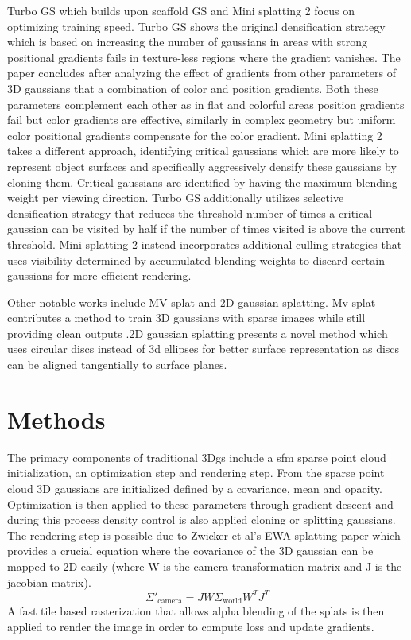 \documentclass[10pt,twocolumn]{article}
\begin{document}
Turbo GS which builds upon scaffold GS and Mini splatting 2 focus on optimizing training speed. Turbo GS shows the original densification strategy which is based on increasing the number of gaussians in areas with strong positional gradients fails in texture-less regions where the gradient vanishes. The paper concludes after analyzing the effect of gradients from other parameters of 3D gaussians
that a combination of color and position gradients. Both these parameters complement each other as in flat and colorful areas position gradients fail but color gradients are effective, similarly in complex geometry but uniform color positional gradients compensate for the color gradient\cite{lu2024turbogsaccelerating3dgaussian}. Mini splatting 2 takes a different approach, identifying critical gaussians which are more likely to represent object surfaces and specifically aggressively densify these gaussians by cloning them. Critical gaussians are identified by having the maximum blending weight per viewing direction\cite{fang2024minisplatting2building360scenes}. Turbo GS additionally utilizes selective densification strategy that reduces the threshold number of times a critical gaussian can be visited by half if the number of times visited is above the current threshold\cite{lu2024turbogsaccelerating3dgaussian}. Mini splatting 2 instead incorporates additional culling strategies that uses visibility determined by accumulated blending weights to discard certain gaussians for more efficient rendering\cite{fang2024minisplatting2building360scenes}.

Other notable works include MV splat  and 2D gaussian splatting. Mv splat contributes a method to train 3D gaussians with sparse images while still providing clean outputs \cite{Chen_2024}.2D gaussian splatting presents a novel method which uses circular discs instead of 3d ellipses for better surface representation as discs can be aligned tangentially to surface planes\cite{Huang2DGS2024}.

\section{Methods}

The primary components of traditional 3Dgs include a sfm sparse point cloud initialization, an optimization step and rendering step. From the sparse point cloud 3D gaussians are initialized defined by a covariance, mean and opacity. Optimization is then applied to these parameters through gradient descent and during this process density control is also applied cloning or splitting gaussians.\cite{kerbl20233dgaussiansplattingrealtime} The rendering step is possible due to Zwicker et al's EWA splatting paper\cite{zwicker2002ewa} which provides a crucial equation where the covariance of the 3D gaussian can be mapped to 2D easily (where W is the camera transformation matrix and J is the jacobian matrix).
\[
\Sigma'_{\text{camera}} = J W \Sigma_{\text{world}} W^T J^T 
\]
A fast tile based rasterization that allows alpha blending of the splats is then applied to render the image in order to compute loss and update gradients\cite{kerbl20233dgaussiansplattingrealtime}. 
\end{document}
